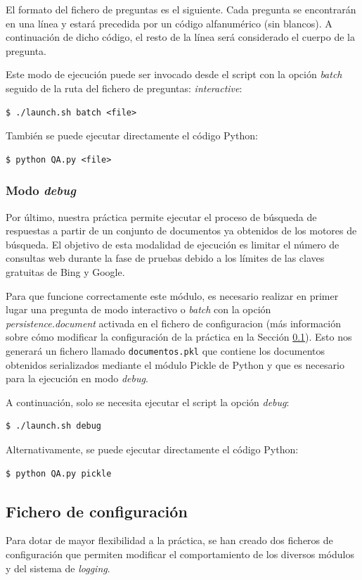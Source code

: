 \documentclass[12pt,a4paper,titlepage]{article}
\begin{document}
El formato del fichero de preguntas es el siguiente. Cada pregunta se encontrarán en una línea y estará precedida por un código alfanumérico (sin blancos). A continuación de dicho código, el resto de la línea será considerado el cuerpo de la pregunta.

Este modo de ejecución puede ser invocado desde el script con la opción \emph{batch} seguido de la ruta del fichero de preguntas:
\emph{interactive}:
\begin{lstlisting}
$ ./launch.sh batch <file>
\end{lstlisting}

También se puede ejecutar directamente el código Python:
\begin{lstlisting}
$ python QA.py <file>
\end{lstlisting}

\subsubsection{Modo \emph{debug}}
Por último, nuestra práctica permite ejecutar el proceso de búsqueda de respuestas a partir de un conjunto de documentos ya obtenidos de los motores de búsqueda. El objetivo de esta modalidad de ejecución es limitar el número de consultas web durante la fase de pruebas debido a los límites de las claves gratuitas de Bing y Google.

Para que funcione correctamente este módulo, es necesario realizar en primer lugar una pregunta de modo interactivo o \emph{batch} con la opción \emph{persistence.document} activada en el fichero de configuracion (más información sobre cómo modificar la configuración de la práctica en la Sección \ref{section:conf}). Esto nos generará un fichero llamado \texttt{documentos.pkl} que contiene los documentos obtenidos serializados mediante el módulo Pickle de Python y que es necesario para la ejecución en modo \emph{debug}.

A continuación, solo se necesita ejecutar el script la opción \emph{debug}:
\begin{lstlisting}
$ ./launch.sh debug
\end{lstlisting}

Alternativamente, se puede ejecutar directamente el código Python:
\begin{lstlisting}
$ python QA.py pickle
\end{lstlisting}

\subsection{Fichero de configuración}
\label{section:conf}
Para dotar de mayor flexibilidad a la práctica, se han creado dos ficheros de configuración que permiten modificar el comportamiento de los diversos módulos y del sistema de \emph{logging}.
\end{document}
